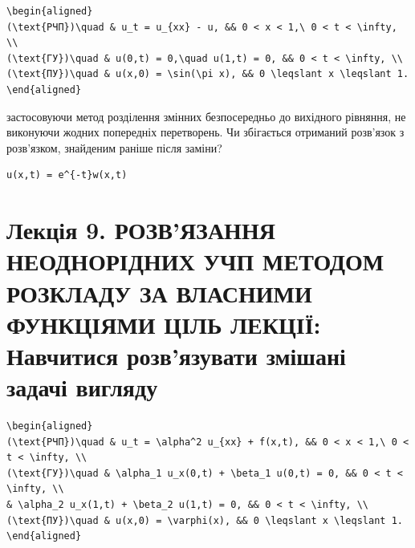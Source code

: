 \documentclass[
  ukrainian,
]{article}
\begin{document}
\begin{verbatim}
\begin{aligned}
(\text{РЧП})\quad & u_t = u_{xx} - u, && 0 < x < 1,\ 0 < t < \infty, \\
(\text{ГУ})\quad & u(0,t) = 0,\quad u(1,t) = 0, && 0 < t < \infty, \\
(\text{ПУ})\quad & u(x,0) = \sin(\pi x), && 0 \leqslant x \leqslant 1.
\end{aligned}
\end{verbatim}

застосовуючи метод розділення змінних безпосередньо до вихідного
рівняння, не виконуючи жодних попередніх перетворень. Чи збігається
отриманий розв'язок з розв'язком, знайденим раніше після заміни?

\begin{verbatim}
u(x,t) = e^{-t}w(x,t)
\end{verbatim}

\section{Лекція 9. РОЗВ'ЯЗАННЯ НЕОДНОРІДНИХ УЧП МЕТОДОМ РОЗКЛАДУ ЗА
ВЛАСНИМИ ФУНКЦІЯМИ ЦІЛЬ ЛЕКЦІЇ: Навчитися розв'язувати змішані задачі
вигляду}\label{ux43bux435ux43aux446ux456ux44f-9.-ux440ux43eux437ux432ux44fux437ux430ux43dux43dux44f-ux43dux435ux43eux434ux43dux43eux440ux456ux434ux43dux438ux445-ux443ux447ux43f-ux43cux435ux442ux43eux434ux43eux43c-ux440ux43eux437ux43aux43bux430ux434ux443-ux437ux430-ux432ux43bux430ux441ux43dux438ux43cux438-ux444ux443ux43dux43aux446ux456ux44fux43cux438-ux446ux456ux43bux44c-ux43bux435ux43aux446ux456ux457-ux43dux430ux432ux447ux438ux442ux438ux441ux44f-ux440ux43eux437ux432ux44fux437ux443ux432ux430ux442ux438-ux437ux43cux456ux448ux430ux43dux456-ux437ux430ux434ux430ux447ux456-ux432ux438ux433ux43bux44fux434ux443}

\begin{verbatim}
\begin{aligned}
(\text{РЧП})\quad & u_t = \alpha^2 u_{xx} + f(x,t), && 0 < x < 1,\ 0 < t < \infty, \\
(\text{ГУ})\quad & \alpha_1 u_x(0,t) + \beta_1 u(0,t) = 0, && 0 < t < \infty, \\
& \alpha_2 u_x(1,t) + \beta_2 u(1,t) = 0, && 0 < t < \infty, \\
(\text{ПУ})\quad & u(x,0) = \varphi(x), && 0 \leqslant x \leqslant 1.
\end{aligned}
\end{verbatim}
\end{document}
